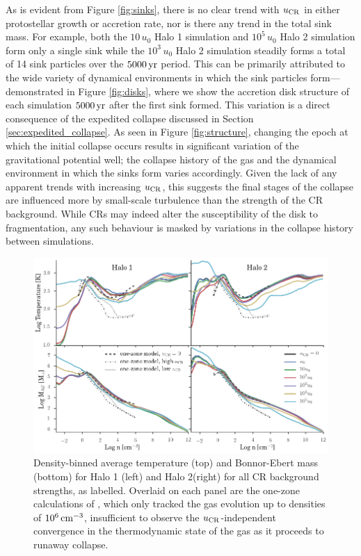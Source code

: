 \documentclass[usenatbib]{mn2e}
\newcommand{\cc}{\,{\rm cm}^{-3}}
\newcommand{\yr}{\,{\rm yr}}
\newcommand{\ucr}{{u}_{\rm \small CR}}
\begin{document}
As is evident from Figure \ref{fig:sinks}, there is no clear trend with $\ucr$ in either protostellar growth or accretion rate, nor is there any trend in the total sink mass.
For example, both the $10\,u_0$ Halo 1 simulation and $10^5\,u_0$ Halo 2 simulation form only a single sink while the $10^3\,u_0$ Halo 2 simulation steadily forms a total of 14 sink particles over the $5000\yr$ period.
This  can be primarily attributed to the wide variety of dynamical environments in which the sink particles form---demonstrated in Figure \ref{fig:disks}, where we show the accretion disk structure of each simulation $5000\yr$ after the first sink formed.
This variation is a direct consequence of the expedited collapse discussed in Section \ref{sec:expedited_collapse}. 
As seen in Figure \ref{fig:structure}, changing the epoch at which the initial collapse occurs results in significant variation of the gravitational potential well; the collapse history of the gas and the dynamical environment in which the sinks form varies accordingly.
Given the lack of any apparent trends with increasing $\ucr$, this suggests the final stages of the collapse are influenced more by small-scale turbulence than the strength of the CR background.
While CRs may indeed alter the susceptibility of the disk to fragmentation, any such behaviour is masked by variations in the collapse history between simulations.
\begin{figure}
\begin{center}
\includegraphics[width=1\textwidth]{figures/binned_T_Mbe/binned_T_Mbe}
\caption{\label{fig:Mbe}
Density-binned average temperature (top) and Bonnor-Ebert mass (bottom) for Halo 1 (left) and Halo 2(right) for all CR background strengths, as labelled.
Overlaid on each panel are the one-zone calculations of \citet{StacyBromm2007}, which only tracked the gas evolution up to densities of $10^6\cc$, insufficient to observe the $\ucr$-independent convergence in the thermodynamic state of the gas as it proceeds to runaway collapse.%
}
\end{center}
\end{figure}
\end{document}
